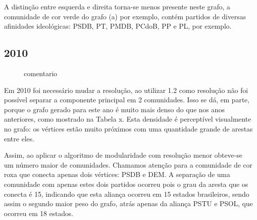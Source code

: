 A distinção entre esquerda e direita torna-se menos presente neste grafo, a comunidade de cor verde do grafo (a) por exemplo, contém partidos de diversas afinidades ideológicas: \gls{PSDB}, \gls{PT}, \gls{PMDB}, \gls{PCdoB}, \gls{PP} e \gls{PL}, por exemplo.

\subsection{2010}
\label{resultados__grafos--2010}

\begin{figure}[H]
\center
    \qquad

    \caption{comentario}
\end{figure}

Em 2010 foi necessário mudar a resolução, ao utilizar 1.2 como resolução não foi possível separar a componente principal em 2 comunidades. Isso se dá, em parte, porque o grafo gerado para este ano é muito mais denso do que nos anos anteriores, como mostrado na Tabela x. Esta densidade é perceptível visualmente no grafo: os vértices estão muito próximos com uma quantidade grande de arestas entre eles.

Assim, ao aplicar o algoritmo de modularidade com resolução menor obteve-se um número maior de comunidades. Chamamos atenção para a comunidade de cor roxa que conecta apenas dois vértices: \gls{PSDB} e \gls{DEM}. A separação de uma comunidade com apenas estes dois partidos ocorreu pois o grau da aresta que os conecta é 15, indicando que esta aliança ocorreu em 15 estados brasileiros, sendo assim o segundo maior peso do grafo, atrás apenas da aliança \gls{PSTU} e \gls{PSOL}, que ocorreu em 18 estados.

